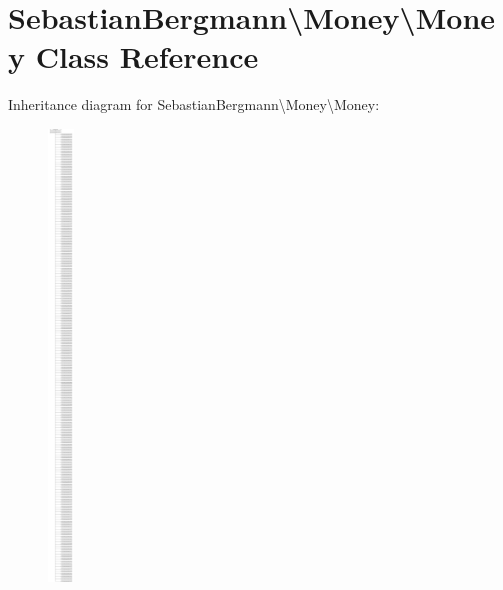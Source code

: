 \hypertarget{classSebastianBergmann_1_1Money_1_1Money}{}\section{Sebastian\+Bergmann\textbackslash{}Money\textbackslash{}Money Class Reference}
\label{classSebastianBergmann_1_1Money_1_1Money}
Inheritance diagram for Sebastian\+Bergmann\textbackslash{}Money\textbackslash{}Money\+:\begin{figure}[H]
\begin{center}
\leavevmode
\includegraphics[height=12.000000cm]{classSebastianBergmann_1_1Money_1_1Money}
\end{center}
\end{figure}
